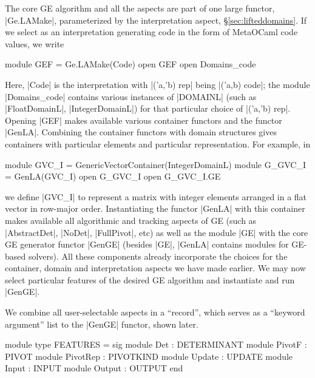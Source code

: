 \documentclass{elsart}
\begin{document}
The core GE algorithm and all the aspects are part of one large
functor, |Ge.LAMake|, parameterized by the interpretation aspect,
\S\ref{sec:lifteddomains}. If we select as an interpretation
generating code in the form of MetaOCaml code values, we write
\begin{code}
module GEF = Ge.LAMake(Code)
open GEF
open Domains_code
\end{code}
Here, |Code| is the interpretation with |('a,'b) rep| being 
|('a,b) code|; the module |Domains_code| contains various instances of |DOMAINL|
(such as \linebreak|FloatDomainL|, |IntegerDomainL|) for that particular
choice of |('a,'b) rep|. Opening |GEF| makes available various
container functors and the functor |GenLA|. Combining
the container functors with domain structures gives containers
with particular elements and particular representation. For example, in
\begin{code}
module GVC_I = GenericVectorContainer(IntegerDomainL)
module G_GVC_I = GenLA(GVC_I)
open G_GVC_I
open G_GVC_I.GE
\end{code}
we define |GVC_I| to represent a matrix with integer elements arranged
in a flat vector in row-major order. Instantiating the functor |GenLA|
with this container makes available all algorithmic and
tracking aspects of GE (such as |AbstractDet|, |NoDet|, |FullPivot|,
etc) as well as the module |GE| with the core GE generator functor |GenGE|
(besides |GE|, |GenLA| contains modules for GE-based solvers). All
these components already incorporate the choices for the
container, domain and interpretation aspects we have made earlier. We
may now select particular features of the desired GE algorithm and
instantiate and run |GenGE|.

We combine all user-selectable aspects in a ``record'', which serves as a
``keyword argument'' list to the |GenGE| functor, shown later.
\begin{code}
module type FEATURES = sig
  module Det       : DETERMINANT
  module PivotF    : PIVOT
  module PivotRep  : PIVOTKIND
  module Update    : UPDATE
  module Input     : INPUT
  module Output    : OUTPUT
end
\end{code}
\end{document}
